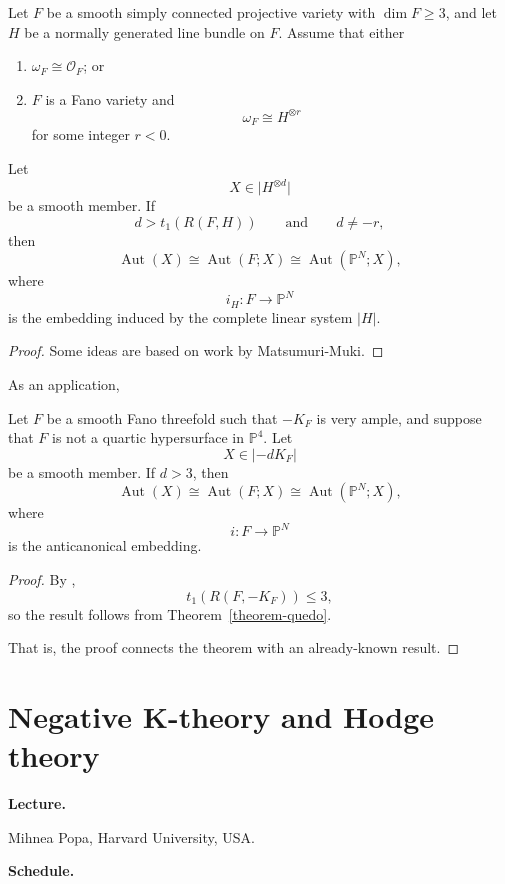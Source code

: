 \begin{theorem}[Quedo]
\label{theorem-quedo}
Let $F$ be a smooth simply connected
projective variety with $\dim F\geq 3$,
and let $H$ be a normally generated line
bundle on $F$. Assume that either
\begin{enumerate}
\item $\omega_F\cong\mathcal{O}_F$; or
\item $F$ is a Fano variety and
\[
\omega_F\cong H^{\otimes r}
\]
for some integer $r<0$.
\end{enumerate}
Let
\[
X\in\lvert H^{\otimes d}\rvert
\]
be a smooth member. If
\[
d>t_1(R(F,H))
\qquad\text{and}\qquad
d\neq-r,
\]
then
\[
\operatorname{Aut}(X)
\cong\operatorname{Aut}(F;X)
\cong\operatorname{Aut}(\mathbb{P}^N;X),
\]
where
\[
i_H:F\longrightarrow\mathbb{P}^N
\]
is the embedding induced by the complete
linear system $\lvert H\rvert$.
\end{theorem}

\begin{proof}
Some ideas are based on work
by Matsumuri-Muki.
\end{proof}

As an application,

\begin{corollary}
\label{lemma-quedo}
Let $F$ be a smooth Fano threefold such
that $-K_F$ is very ample, and suppose
that $F$ is not a quartic hypersurface
in $\mathbb{P}^4$. Let
\[
X\in\lvert-dK_F\rvert
\]
be a smooth member. If $d>3$, then
\[
\operatorname{Aut}(X)
\cong\operatorname{Aut}(F;X)
\cong\operatorname{Aut}(\mathbb{P}^N;X),
\]
where
\[
i:F\longrightarrow\mathbb{P}^N
\]
is the anticanonical embedding.
\end{corollary}

\begin{proof}
By \cite{CPS07},
\[
t_1(R(F,-K_F))\leq 3,
\]
so the result follows from
Theorem~\ref{theorem-quedo}.

That is, the proof connects the theorem with
an already-known result.
\end{proof}

\section{Negative K-theory and Hodge theory}
\label{section-negative-k-theory}

\medskip\noindent
{\bf Lecture.}

Mihnea Popa,
Harvard University, USA.

\medskip\noindent
{\bf Schedule.}

